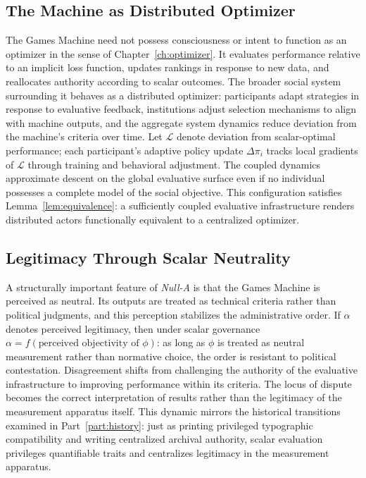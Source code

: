 \documentclass[12pt, oneside]{book}
\theoremstyle{plain}
\theoremstyle{definition}
\theoremstyle{remark}
\theoremstyle{definition}
\begin{document}
\subsection{The Machine as Distributed Optimizer}

The Games Machine need not possess consciousness or intent to function as an optimizer
in the sense of Chapter~\ref{ch:optimizer}. It evaluates performance relative to an
implicit loss function, updates rankings in response to new data, and reallocates
authority according to scalar outcomes. The broader social system surrounding it
behaves as a distributed optimizer: participants adapt strategies in response to
evaluative feedback, institutions adjust selection mechanisms to align with machine
outputs, and the aggregate system dynamics reduce deviation from the machine's criteria
over time. Let $\mathcal{L}$ denote deviation from scalar-optimal performance; each
participant's adaptive policy update $\Delta \pi_i$ tracks local gradients of
$\mathcal{L}$ through training and behavioral adjustment. The coupled dynamics
approximate descent on the global evaluative surface even if no individual possesses
a complete model of the social objective. This configuration satisfies
Lemma~\ref{lem:equivalence}: a sufficiently coupled evaluative infrastructure renders
distributed actors functionally equivalent to a centralized optimizer.

\subsection{Legitimacy Through Scalar Neutrality}

A structurally important feature of \textit{Null-A} is that the Games Machine is
perceived as neutral. Its outputs are treated as technical criteria rather than
political judgments, and this perception stabilizes the administrative order.
If $\alpha$ denotes perceived legitimacy, then under scalar governance
$\alpha = f(\text{perceived objectivity of } \phi)$: as long as $\phi$ is treated
as neutral measurement rather than normative choice, the order is resistant to
political contestation. Disagreement shifts from challenging the authority of the
evaluative infrastructure to improving performance within its criteria. The locus
of dispute becomes the correct interpretation of results rather than the legitimacy
of the measurement apparatus itself. This dynamic mirrors the historical transitions
examined in Part~\ref{part:history}: just as printing privileged typographic
compatibility and writing centralized archival authority, scalar evaluation privileges
quantifiable traits and centralizes legitimacy in the measurement apparatus.
\end{document}
